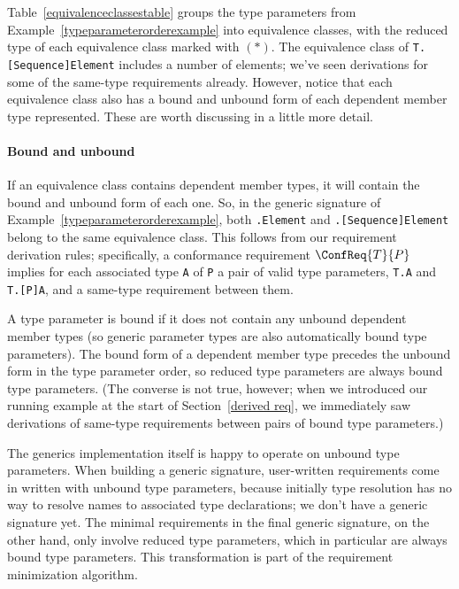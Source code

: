 \documentclass[../generics]{subfiles}
\begin{document}
\begin{example}
Table~\ref{equivalenceclassestable} groups the type parameters from Example~\ref{typeparameterorderexample} into equivalence classes, with the reduced type of each equivalence class marked with $(*)$. The equivalence class of \texttt{T.[Sequence]Element} includes a number of elements; we've seen derivations for some of the same-type requirements already. However, notice that each equivalence class also has a bound and unbound form of each dependent member type represented. These are worth discussing in a little more detail.
\end{example}

\paragraph{Bound and unbound}
If an equivalence class contains dependent member types, it will contain the bound and unbound form of each one. So, in the generic signature of Example~\ref{typeparameterorderexample}, both \texttt{.Element} and \texttt{.[Sequence]Element} belong to the same equivalence class. This follows from our requirement derivation rules; specifically, a conformance requirement $\ConfReq{T}{P}$ implies for each associated type \texttt{A} of \texttt{P} a pair of valid type parameters, \verb|T.A| and \verb|T.[P]A|, and a same-type requirement between them.

A type parameter is bound if it does not contain any unbound dependent member types (so generic parameter types are also automatically bound type parameters). The bound form of a dependent member type precedes the unbound form in the type parameter order, so reduced type parameters are always bound type parameters. (The converse is not true, however; when we introduced our running example at the start of Section~\ref{derived req}, we immediately saw derivations of same-type requirements between pairs of bound type parameters.)

The generics implementation itself is happy to operate on unbound type parameters. When building a generic signature, user-written requirements come in written with unbound type parameters, because initially type resolution has no way to resolve names to associated type declarations; we don't have a generic signature yet. The minimal requirements in the final generic signature, on the other hand, only involve reduced type parameters, which in particular are always bound type parameters. This transformation is part of the requirement minimization algorithm.
\end{document}
